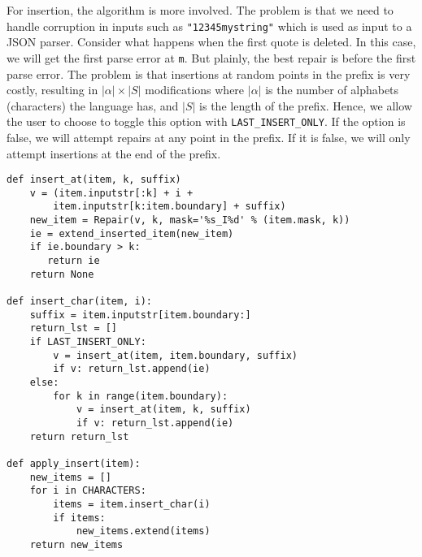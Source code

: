 \documentclass[sigconf,review,anonymous]{acmart}
\def\<#1>{\texttt{#1}}
\newcommand{\brepair}{\textit{BRepair}\xspace}
\begin{document}
For insertion, the algorithm is more involved. The problem is that we need to
handle corruption in inputs such as \<"12345mystring"> which is used as input
to a JSON parser. Consider what happens when the first quote is deleted. In this
case, we will get the first parse error at \<m>. But plainly, the best repair
is before the first parse error. The problem is that insertions at random
points in the prefix is very costly, resulting in $|\alpha| \times |S|$
modifications where $|\alpha|$ is the number of alphabets (characters) the
language has, and $|S|$ is the length of the prefix.
Hence, we allow the user to choose to toggle this option with
\<LAST\_INSERT\_ONLY>. If the option is false, we will attempt repairs at any
point in the prefix. If it is false, we will only attempt insertions at the end
of the prefix.
\begin{lstlisting}[caption=\brepair repairs,label={lst:repairs}]
def insert_at(item, k, suffix)
    v = (item.inputstr[:k] + i +
        item.inputstr[k:item.boundary] + suffix)
    new_item = Repair(v, k, mask='%s_I%d' % (item.mask, k))
    ie = extend_inserted_item(new_item)
    if ie.boundary > k:
       return ie
    return None

def insert_char(item, i):
    suffix = item.inputstr[item.boundary:]
    return_lst = []
    if LAST_INSERT_ONLY:
        v = insert_at(item, item.boundary, suffix)
        if v: return_lst.append(ie)
    else:
        for k in range(item.boundary):
            v = insert_at(item, k, suffix)
            if v: return_lst.append(ie)
    return return_lst

def apply_insert(item):
    new_items = []
    for i in CHARACTERS:
        items = item.insert_char(i)
        if items:
            new_items.extend(items)
    return new_items
\end{lstlisting}
\end{document}
